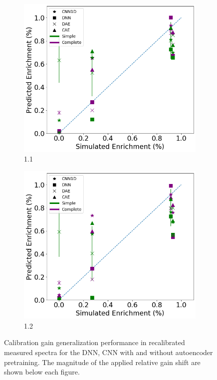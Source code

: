 \begin{figure}[H]
     \begin{subfigure}[b]{0.49\textwidth}
         \centering
         \includegraphics[width=\textwidth]{images/measured_uranium_11.png}
         \caption{1.1}
         \label{fig:measured_uranium_11}
     \end{subfigure}
     \hfill
     \begin{subfigure}[b]{0.49\textwidth}
         \centering
         \includegraphics[width=\textwidth]{images/measured_uranium_12.png}
         \caption{1.2}
         \label{fig:measured_uranium_12}
     \end{subfigure}
        \caption{Calibration gain generalization performance in recalibrated measured spectra for the DNN, CNN with and without autoencoder pretraining. The magnitude of the applied relative gain shift are shown below each figure.}
        \label{fig:realuranium-cal}
\end{figure}



